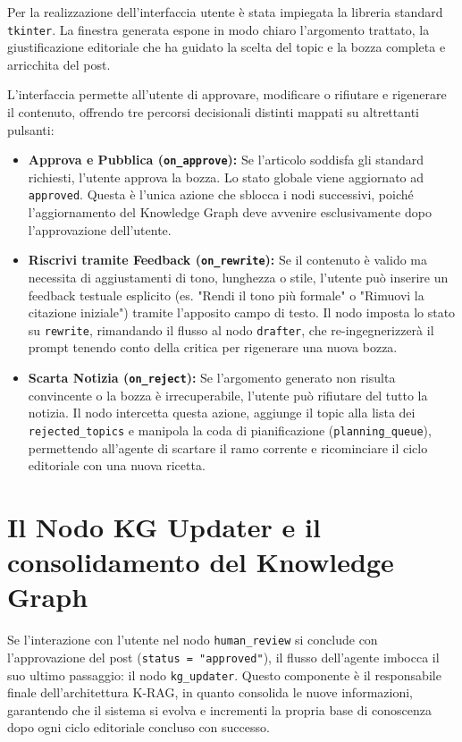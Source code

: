 \documentclass[11pt, a4paper]{article}
\begin{document}
Per la realizzazione dell'interfaccia utente è stata impiegata la libreria standard \texttt{tkinter}. La finestra generata espone in modo chiaro l'argomento trattato, la giustificazione editoriale che ha guidato la scelta del topic e la bozza completa e arricchita del post. 

L'interfaccia permette all'utente di approvare, modificare o rifiutare e rigenerare il contenuto, offrendo tre percorsi decisionali distinti mappati su altrettanti pulsanti:

\begin{itemize}
    \item \textbf{Approva e Pubblica (\texttt{on\_approve}):} Se l'articolo soddisfa gli standard richiesti, l'utente approva la bozza. Lo stato globale viene aggiornato ad \texttt{approved}. Questa è l'unica azione che sblocca i nodi successivi, poiché l'aggiornamento del Knowledge Graph deve avvenire esclusivamente dopo l'approvazione dell'utente.
    
    \item \textbf{Riscrivi tramite Feedback (\texttt{on\_rewrite}):} Se il contenuto è valido ma necessita di aggiustamenti di tono, lunghezza o stile, l'utente può inserire un feedback testuale esplicito (es. "Rendi il tono più formale" o "Rimuovi la citazione iniziale") tramite l'apposito campo di testo. Il nodo imposta lo stato su \texttt{rewrite}, rimandando il flusso al nodo \texttt{drafter}, che re-ingegnerizzerà il prompt tenendo conto della critica per rigenerare una nuova bozza.
    
    \item \textbf{Scarta Notizia (\texttt{on\_reject}):} Se l'argomento generato non risulta convincente o la bozza è irrecuperabile, l'utente può rifiutare del tutto la notizia. Il nodo intercetta questa azione, aggiunge il topic alla lista dei \texttt{rejected\_topics} e manipola la coda di pianificazione (\texttt{planning\_queue}), permettendo all'agente di scartare il ramo corrente e ricominciare il ciclo editoriale con una nuova ricetta.
\end{itemize}

\section{Il Nodo KG Updater e il consolidamento del Knowledge Graph}

Se l'interazione con l'utente nel nodo \texttt{human\_review} si conclude con l'approvazione del post (\texttt{status = "approved"}), il flusso dell'agente imbocca il suo ultimo passaggio: il nodo \texttt{kg\_updater}. Questo componente è il responsabile finale dell'architettura K-RAG, in quanto consolida le nuove informazioni, garantendo che il sistema si evolva e incrementi la propria base di conoscenza dopo ogni ciclo editoriale concluso con successo.
\end{document}
